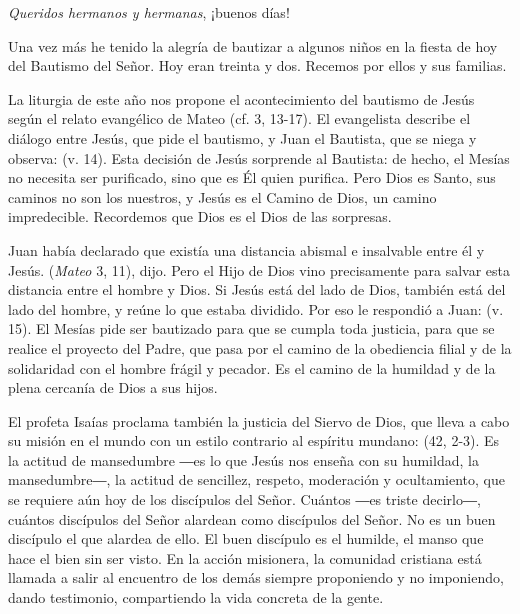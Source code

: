 			\begin{body}
				\emph{Queridos hermanos y hermanas}, ¡buenos días!
				
				Una vez más he tenido la alegría de bautizar a algunos niños en la fiesta de hoy del Bautismo del Señor. Hoy eran treinta y dos. Recemos por ellos y sus familias.
				
				La liturgia de este año nos propone el acontecimiento del bautismo de Jesús según el relato evangélico de Mateo (cf. 3, 13-17). El evangelista describe el diálogo entre Jesús, que pide el bautismo, y Juan el Bautista, que se niega y observa:  (v. 14). Esta decisión de Jesús sorprende al Bautista: de hecho, el Mesías no necesita ser purificado, sino que es Él quien purifica. Pero Dios es Santo, sus caminos no son los nuestros, y Jesús es el Camino de Dios, un camino impredecible. Recordemos que Dios es el Dios de las sorpresas.
				
				Juan había declarado que existía una distancia abismal e insalvable entre él y Jesús.  (\emph{Mateo} 3, 11), dijo. Pero el Hijo de Dios vino precisamente para salvar esta distancia entre el hombre y Dios. Si Jesús está del lado de Dios, también está del lado del hombre, y reúne lo que estaba dividido. Por eso le respondió a Juan:  (v. 15). El Mesías pide ser bautizado para que se cumpla toda justicia, para que se realice el proyecto del Padre, que pasa por el camino de la obediencia filial y de la solidaridad con el hombre frágil y pecador. Es el camino de la humildad y de la plena cercanía de Dios a sus hijos.
				
				El profeta Isaías proclama también la justicia del Siervo de Dios, que lleva a cabo su misión en el mundo con un estilo contrario al espíritu mundano:  (42, 2-3). Es la actitud de mansedumbre ―es lo que Jesús nos enseña con su humildad, la mansedumbre―, la actitud de sencillez, respeto, moderación y ocultamiento, que se requiere aún hoy de los discípulos del Señor. Cuántos ―es triste decirlo―, cuántos discípulos del Señor alardean como discípulos del Señor. No es un buen discípulo el que alardea de ello. El buen discípulo es el humilde, el manso que hace el bien sin ser visto. En la acción misionera, la comunidad cristiana está llamada a salir al encuentro de los demás siempre proponiendo y no imponiendo, dando testimonio, compartiendo la vida concreta de la gente.
				

\end{body}
